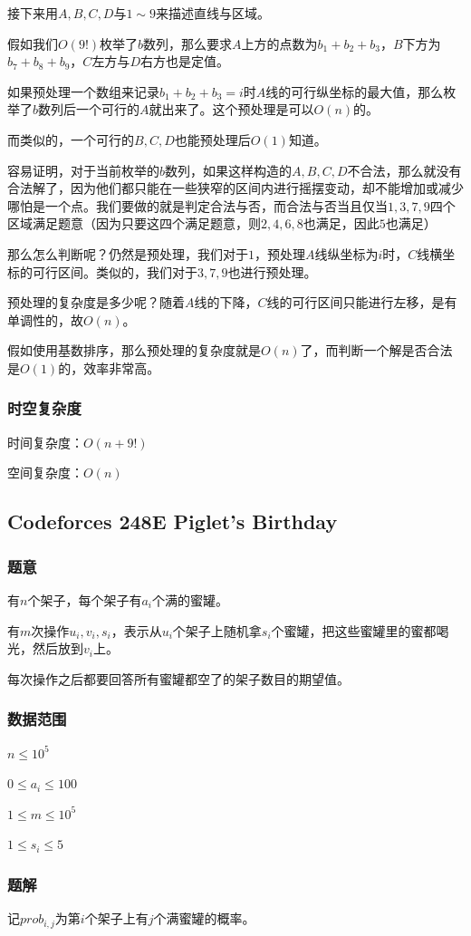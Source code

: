 \documentclass{ctexart}
\begin{document}
接下来用$A,B,C,D$与$1 \sim 9$来描述直线与区域。

假如我们$O(9!)$枚举了$b$数列，那么要求$A$上方的点数为$b_1+b_2+b_3$，$B$下方为$b_7+b_8+b_9$，$C$左方与$D$右方也是定值。

如果预处理一个数组来记录$b_1+b_2+b_3=i$时$A$线的可行纵坐标的最大值，那么枚举了$b$数列后一个可行的$A$就出来了。这个预处理是可以$O(n)$的。

而类似的，一个可行的$B,C,D$也能预处理后$O(1)$知道。

容易证明，对于当前枚举的$b$数列，如果这样构造的$A,B,C,D$不合法，那么就没有合法解了，因为他们都只能在一些狭窄的区间内进行摇摆变动，却不能增加或减少哪怕是一个点。我们要做的就是判定合法与否，而合法与否当且仅当$1,3,7,9$四个区域满足题意（因为只要这四个满足题意，则$2,4,6,8$也满足，因此$5$也满足）

那么怎么判断呢？仍然是预处理，我们对于$1$，预处理$A$线纵坐标为$i$时，$C$线横坐标的可行区间。类似的，我们对于$3,7,9$也进行预处理。

预处理的复杂度是多少呢？随着$A$线的下降，$C$线的可行区间只能进行左移，是有单调性的，故$O(n)$。

假如使用基数排序，那么预处理的复杂度就是$O(n)$了，而判断一个解是否合法是$O(1)$的，效率非常高。
\subsubsection{时空复杂度}
时间复杂度：$O(n+9!)$

空间复杂度：$O(n)$
\subsection{Codeforces 248E Piglet's Birthday}
\subsubsection{题意}
有$n$个架子，每个架子有$a_i$个满的蜜罐。

有$m$次操作$u_i,v_i,s_i$，表示从$u_i$个架子上随机拿$s_i$个蜜罐，把这些蜜罐里的蜜都喝光，然后放到$v_i$上。

每次操作之后都要回答所有蜜罐都空了的架子数目的期望值。
\subsubsection{数据范围}
$n \le 10^5$

$0 \le a_i \le 100$

$1 \le m \le 10^5$

$1 \le s_i \le 5$
\subsubsection{题解}
记$prob_{i,j}$为第$i$个架子上有$j$个满蜜罐的概率。
\end{document}
